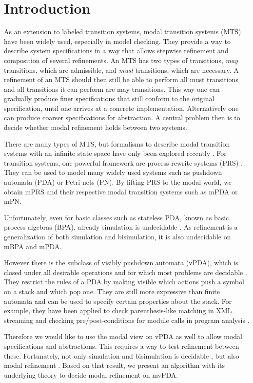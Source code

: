 
\newpage

\chapter{Introduction}

As an extension to labeled transition systems,
modal transition systems (MTS) \cite{LarsenT88}
have been widely used, especially in model checking.
They provide a way to describe system specifications
in a way that allows stepwise refinement
and composition of several refinements.
An MTS has two types of transitions, \emph{may} transitions, which are admissible,
and \emph{must} transitions, which are necessary.
A refinement of an MTS should then still be able to perform
all must transitions and all transitions it can perform are may transitions.
This way one can gradually produce finer specifications that still conform
to the original specification, until one arrives at a concrete implementation.
Alternatively one can produce coarser specifications for abstraction.
A central problem then is to decide whether modal refinement holds between
two systems.

There are many types of MTS, 
but formalisms to describe modal transition systems with
an infinite state space have only been explored recently \cite{BenesK12}.
For transition systems, one powerful framework are
process rewrite systems (PRS) \cite{Mayr00, Esparza01}.
They can be used to model many widely used systems
such as pushdown automata (PDA) or Petri nets (PN).
By lifting PRS to the modal world, we obtain mPRS
and their respective modal transition systems such as
mPDA or mPN.

Unfortunately, even for basic classes such as
stateless PDA, known as basic process algebras (BPA), already simulation is
undecidable \cite{GrooteH94}.
As refinement is a generalization of both simulation and bisimulation,
it is also undecidable on mBPA and mPDA.

However there is the subclass of visibly pushdown automata (vPDA),
which is closed under all desirable operations
and for which most problems are decidable \cite{AlurM04}.
They restrict the rules of a PDA by making visible which
actions push a symbol on a stack and which pop one.
They are still more expressive than finite automata 
and can be used to specify certain properties about the stack.
For example, they have been applied to check
parenthesis-like matching in XML streaming
\cite{KumarMV07}
and checking pre/post-conditions for module calls
in program analysis \cite{AlurEM04}.

Therefore we would like to use the modal view on vPDA
as well to allow modal specifications and abstractions.
This requires a way to test refinement between these.
Fortunately, not only simulation and bisimulation
is decidable \cite{Srba06},
but also modal refinement \cite{BenesK12}.
Based on that result, we present
an algorithm with its underlying theory
to decide modal refinement on mvPDA.



